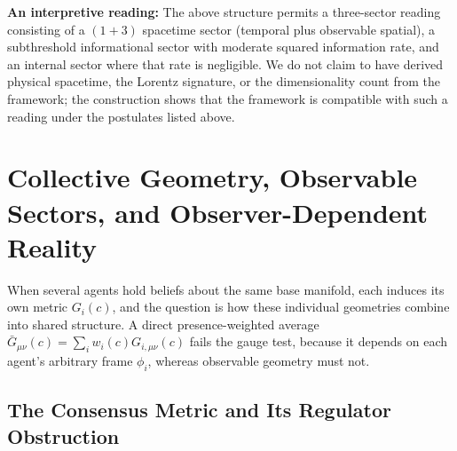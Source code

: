 \documentclass[11pt]{article}
\begin{document}
\begin{center}
{\begin{minipage}{0.9\columnwidth}
\textbf{An interpretive reading:} The above structure permits a three-sector reading consisting of a $(1+3)$ spacetime sector (temporal plus observable spatial), a subthreshold informational sector with moderate squared information rate, and an internal sector where that rate is negligible. We do not claim to have derived physical spacetime, the Lorentz signature, or the dimensionality count from the framework; the construction shows that the framework is compatible with such a reading under the postulates listed above.
\end{minipage}}
\end{center}
\section{Collective Geometry, Observable Sectors, and Observer-Dependent Reality}\label{sec:collective_geometry}

When several agents hold beliefs about the same base manifold, each induces its own metric $G_i(c)$, and the question is how these individual geometries combine into shared structure. A direct presence-weighted average $\bar{G}_{\mu\nu}(c) = \sum_i w_i(c) G_{i,\mu\nu}(c)$ fails the gauge test, because it depends on each agent's arbitrary frame $\phi_i$, whereas observable geometry must not.

\subsection{The Consensus Metric and Its Regulator Obstruction}
\label{sec:consensus_metric}
\end{document}
